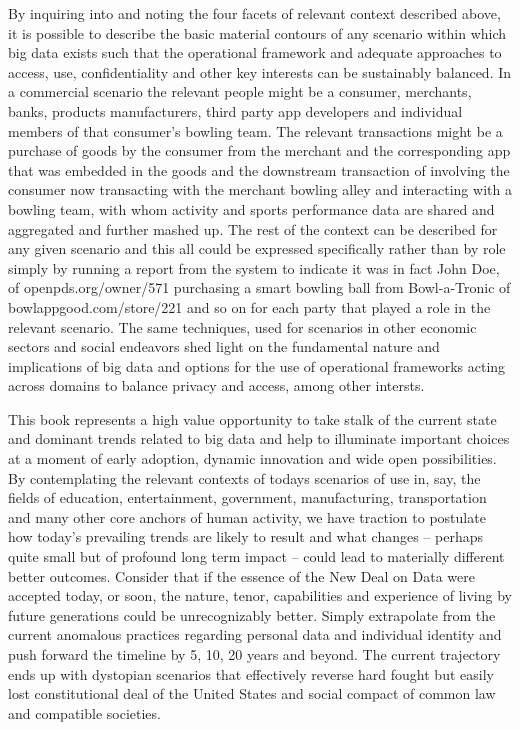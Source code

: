 By inquiring into and noting the four facets of relevant context described above, it is possible to describe the basic material contours of any scenario within which big data exists such that the operational framework and adequate approaches to access, use, confidentiality and other key interests can be sustainably balanced. In a commercial scenario the relevant people might be a consumer, merchants, banks, products manufacturers, third party app developers and individual members of that consumer’s bowling team. The relevant transactions might be a purchase of goods by the consumer from the merchant and the corresponding app that was embedded in the goods and the downstream transaction of involving the consumer now transacting with the merchant bowling alley and interacting with a bowling team, with whom activity and sports performance data are shared and aggregated and further mashed up. The rest of the context can be described for any given scenario and this all could be expressed specifically rather than by role simply by running a report from the system to indicate it was in fact John Doe, of openpds.org/owner/571 purchasing a smart bowling ball from Bowl-a-Tronic of bowlappgood.com/store/221 and so on for each party that played a role in the relevant scenario. The same techniques, used for scenarios in other economic sectors and social endeavors shed light on the fundamental nature and implications of big data and options for the use of operational frameworks acting across domains to balance privacy and access, among other intersts.

This book represents a high value opportunity to take stalk of the current state and dominant trends related to big data and help to illuminate important choices at a moment of early adoption, dynamic innovation and wide open possibilities. By contemplating the relevant contexts of todays scenarios of use in, say, the fields of education, entertainment, government, manufacturing, transportation and many other core anchors of human activity, we have traction to postulate how today’s prevailing trends are likely to result and what changes – perhaps quite small but of profound long term impact – could lead to materially different better outcomes. Consider that if the essence of the New Deal on Data were accepted today, or soon, the nature, tenor, capabilities and experience of living by future generations could be unrecognizably better. Simply extrapolate from the current anomalous practices regarding personal data and individual identity and push forward the timeline by 5, 10, 20 years and beyond. The current trajectory ends up with dystopian scenarios that effectively reverse hard fought but easily lost constitutional deal of the United States and social compact of common law and compatible societies.

